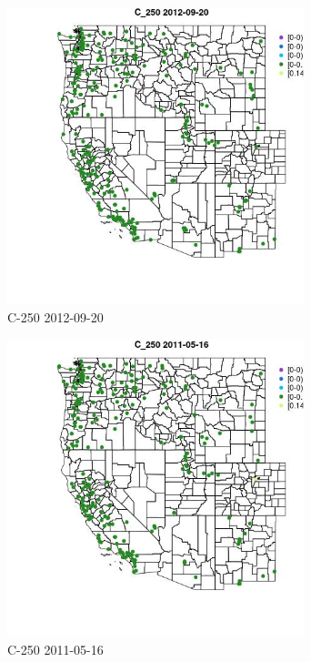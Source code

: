 \begin{figure} 
\centering  
\includegraphics[width=0.77\textwidth]{Code_Outputs/ML_input_report_ML_input_PM25_Step5_part_d_de_duplicated_aves_ML_input_MapObsC_2502012-09-20.jpg} 
\caption{\label{fig:ML_input_report_ML_input_PM25_Step5_part_d_de_duplicated_aves_ML_inputMapObsC_2502012-09-20}C-250 2012-09-20} 
\end{figure} 
 

\begin{figure} 
\centering  
\includegraphics[width=0.77\textwidth]{Code_Outputs/ML_input_report_ML_input_PM25_Step5_part_d_de_duplicated_aves_ML_input_MapObsC_2502011-05-16.jpg} 
\caption{\label{fig:ML_input_report_ML_input_PM25_Step5_part_d_de_duplicated_aves_ML_inputMapObsC_2502011-05-16}C-250 2011-05-16} 
\end{figure} 
 

